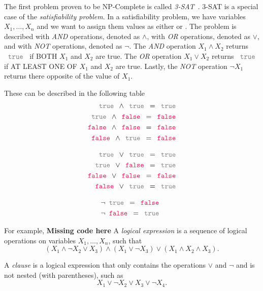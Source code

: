 The first problem proven to be NP-Complete is called \emph{3-SAT}~\cite{}.  3-SAT is a special case of the \emph{satisfiability problem}.   In a satisfiability problem, we have variables $X_1, \dots, X_n$ and we want to assign them values as either \true or \false.  The problem is described with \emph{AND} operations, denoted as $\land$,  with \emph{OR} operations, denoted as $\lor$, and with \emph{NOT} operations, denoted as $\neg$.  The \emph{AND} operation $X_1 \land X_2$ returns $\true$ if BOTH $X_1$ and $X_2$ are true.  The \emph{OR} operation $X_1 \lor X_2$ returns $\true$ if AT LEAST ONE OF  $X_1$ and $X_2$ are true.  Lastly, the \emph{NOT} operation $\neg X_1$ returns there opposite of the value of $X_1$.

These can be described in the following table
\begin{align}
\true \land \true = \true\\
\true \land \false = \false\\
\false \land \false = \false\\
\false \land \true = \false
\end{align}

\begin{align}
\true \lor \true = \true\\
\true \lor \false = \true\\
\false \lor \false = \false\\
\false \lor \true = \true
\end{align}

\begin{align}
\neg \true = \false\\
\neg \false = \true
\end{align}

For example, \textbf{Missing code here}
A \emph{logical expression} is a sequence of logical operations on variables $X_1, \dots, X_n$, such that 
\begin{equation}
(X_1 \land \neg X_2 \lor X_3) \land (X_1 \lor \neg X_3) \lor (X_1 \land X_2 \land X_3).
\end{equation}

A \emph{clause} is a logical expression that only contains the operations $\lor$ and $\neg$ and is not nested (with parentheses), such as 
\begin{equation}
X_1 \lor \neg X_2 \lor X_3 \lor \neg X_4.
\end{equation}

